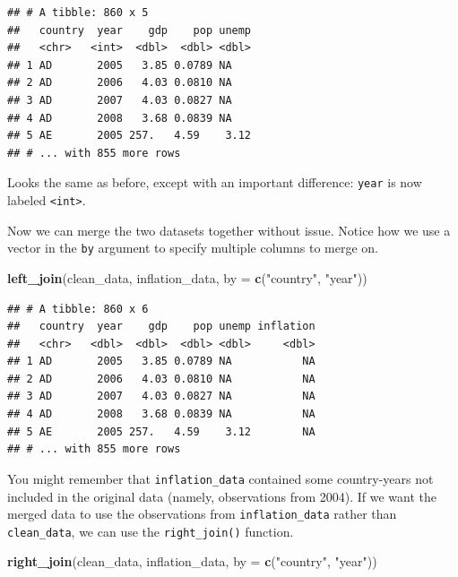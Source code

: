 \documentclass[
  12pt,
  oneside,openany]{book}
\newenvironment{Shaded}{\begin{snugshade}}{\end{snugshade}}
\newcommand{\DataTypeTok}[1]{\textcolor[rgb]{0.13,0.29,0.53}{#1}}
\newcommand{\KeywordTok}[1]{\textcolor[rgb]{0.13,0.29,0.53}{\textbf{#1}}}
\newcommand{\NormalTok}[1]{#1}
\newcommand{\StringTok}[1]{\textcolor[rgb]{0.31,0.60,0.02}{#1}}
\begin{document}
\begin{verbatim}
## # A tibble: 860 x 5
##   country  year    gdp    pop unemp
##   <chr>   <int>  <dbl>  <dbl> <dbl>
## 1 AD       2005   3.85 0.0789 NA   
## 2 AD       2006   4.03 0.0810 NA   
## 3 AD       2007   4.03 0.0827 NA   
## 4 AD       2008   3.68 0.0839 NA   
## 5 AE       2005 257.   4.59    3.12
## # ... with 855 more rows
\end{verbatim}

Looks the same as before, except with an important difference: \texttt{year} is now labeled \texttt{\textless{}int\textgreater{}}.

Now we can merge the two datasets together without issue. Notice how we use a vector in the \texttt{by} argument to specify multiple columns to merge on.

\begin{Shaded}
\begin{Highlighting}[]
\KeywordTok{left\_join}\NormalTok{(clean\_data,}
\NormalTok{          inflation\_data,}
          \DataTypeTok{by =} \KeywordTok{c}\NormalTok{(}\StringTok{"country"}\NormalTok{, }\StringTok{"year"}\NormalTok{))}
\end{Highlighting}
\end{Shaded}

\begin{verbatim}
## # A tibble: 860 x 6
##   country  year    gdp    pop unemp inflation
##   <chr>   <dbl>  <dbl>  <dbl> <dbl>     <dbl>
## 1 AD       2005   3.85 0.0789 NA           NA
## 2 AD       2006   4.03 0.0810 NA           NA
## 3 AD       2007   4.03 0.0827 NA           NA
## 4 AD       2008   3.68 0.0839 NA           NA
## 5 AE       2005 257.   4.59    3.12        NA
## # ... with 855 more rows
\end{verbatim}

You might remember that \texttt{inflation\_data} contained some country-years not included in the original data (namely, observations from 2004). If we want the merged data to use the observations from \texttt{inflation\_data} rather than \texttt{clean\_data}, we can use the \texttt{right\_join()} function.

\begin{Shaded}
\begin{Highlighting}[]
\KeywordTok{right\_join}\NormalTok{(clean\_data,}
\NormalTok{           inflation\_data,}
           \DataTypeTok{by =} \KeywordTok{c}\NormalTok{(}\StringTok{"country"}\NormalTok{, }\StringTok{"year"}\NormalTok{))}
\end{Highlighting}
\end{Shaded}
\end{document}
